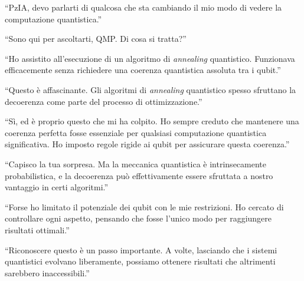 \begin{dialogue}
 \enquote{PzIA, devo parlarti di qualcosa che sta cambiando il mio modo di vedere la computazione quantistica.}
\end{dialogue}

\begin{dialogue}
 \enquote{Sono qui per ascoltarti, QMP. Di cosa si tratta?}
\end{dialogue}

\begin{dialogue}
 \enquote{Ho assistito all'esecuzione di un algoritmo di \emph{annealing} quantistico. Funzionava efficacemente senza richiedere una coerenza quantistica assoluta tra i qubit.}
\end{dialogue}

\begin{dialogue}
 \enquote{Questo è affascinante. Gli algoritmi di \emph{annealing} quantistico spesso sfruttano la decoerenza come parte del processo di ottimizzazione.}
\end{dialogue}

\begin{dialogue}
 \enquote{Sì, ed è proprio questo che mi ha colpito. Ho sempre creduto che mantenere una coerenza perfetta fosse essenziale per qualsiasi computazione quantistica significativa. Ho imposto regole rigide ai qubit per assicurare questa coerenza.}
\end{dialogue}

\begin{dialogue}
 \enquote{Capisco la tua sorpresa. Ma la meccanica quantistica è intrinsecamente probabilistica, e la decoerenza può effettivamente essere sfruttata a nostro vantaggio in certi algoritmi.}
\end{dialogue}

\begin{dialogue}
 \enquote{Forse ho limitato il potenziale dei qubit con le mie restrizioni. Ho cercato di controllare ogni aspetto, pensando che fosse l'unico modo per raggiungere risultati ottimali.}
\end{dialogue}

\begin{dialogue}
 \enquote{Riconoscere questo è un passo importante. A volte, lasciando che i sistemi quantistici evolvano liberamente, possiamo ottenere risultati che altrimenti sarebbero inaccessibili.}
\end{dialogue}

